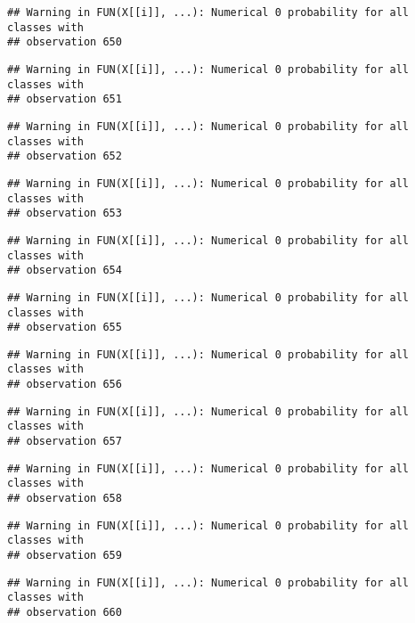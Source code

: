 \documentclass[
]{article}
\begin{document}
\begin{verbatim}
## Warning in FUN(X[[i]], ...): Numerical 0 probability for all classes with
## observation 650
\end{verbatim}

\begin{verbatim}
## Warning in FUN(X[[i]], ...): Numerical 0 probability for all classes with
## observation 651
\end{verbatim}

\begin{verbatim}
## Warning in FUN(X[[i]], ...): Numerical 0 probability for all classes with
## observation 652
\end{verbatim}

\begin{verbatim}
## Warning in FUN(X[[i]], ...): Numerical 0 probability for all classes with
## observation 653
\end{verbatim}

\begin{verbatim}
## Warning in FUN(X[[i]], ...): Numerical 0 probability for all classes with
## observation 654
\end{verbatim}

\begin{verbatim}
## Warning in FUN(X[[i]], ...): Numerical 0 probability for all classes with
## observation 655
\end{verbatim}

\begin{verbatim}
## Warning in FUN(X[[i]], ...): Numerical 0 probability for all classes with
## observation 656
\end{verbatim}

\begin{verbatim}
## Warning in FUN(X[[i]], ...): Numerical 0 probability for all classes with
## observation 657
\end{verbatim}

\begin{verbatim}
## Warning in FUN(X[[i]], ...): Numerical 0 probability for all classes with
## observation 658
\end{verbatim}

\begin{verbatim}
## Warning in FUN(X[[i]], ...): Numerical 0 probability for all classes with
## observation 659
\end{verbatim}

\begin{verbatim}
## Warning in FUN(X[[i]], ...): Numerical 0 probability for all classes with
## observation 660
\end{verbatim}
\end{document}
